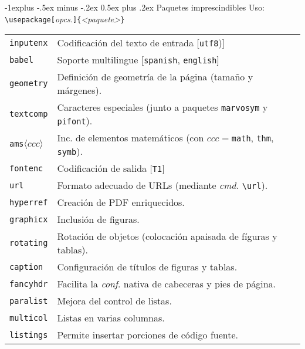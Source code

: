 \documentclass[10pt,landscape,a4paper]{article}
\makeatletter
\renewcommand{\subsection}{\@startsection{subsection}{2}{0mm}%
                                {-1explus -.5ex minus -.2ex}%
                                {0.5ex plus .2ex}%
                                {\normalfont\normalsize\bfseries}}
\makeatother
\begin{document}
\begin{multicols}{3}
\subsection{Paquetes imprescindibles}
  Uso: \verb!\usepackage[!\emph{opcs.}\verb!]{!\emph{<paquete>}\verb!}!\\[0.7mm]


\begin{tabular}{@{}p{\the\MyLen}%
                @{}p{\linewidth-\the\MyLen}@{}}
\texttt{inputenx}	& Codificación del texto de entrada [\texttt{utf8})]\\
\texttt{babel}		& Soporte multilingue [\texttt{spanish}, \texttt{english}]\\
\texttt{geometry}	& Definición de geometría de la página (tamaño y márgenes).\\
\texttt{textcomp}	& Caracteres especiales (junto a paquetes \texttt{marvosym} y \texttt{pifont}). \\
\texttt{ams}$\langle ccc \rangle$ & Inc. de elementos matemáticos (con $ccc=$\texttt{math}, \texttt{thm}, \texttt{symb}).\\
\texttt{fontenc}	& Codificación de salida [\texttt{T1}]\\
\texttt{url}		& Formato adecuado de URLs (mediante \emph{cmd.} \verb!\url!). \\
\texttt{hyperref}	& Creación de PDF enriquecidos.\\
\texttt{graphicx}	& Inclusión de figuras.\\
\texttt{rotating}	& Rotación de objetos (colocación apaisada de fíguras y tablas).\\
\texttt{caption}	& Configuración de títulos de figuras y tablas. \\
\texttt{fancyhdr}	& Facilita la \emph{conf}. nativa de cabeceras y pies de página.\\
\texttt{paralist}	& Mejora del control de listas.\\
\texttt{multicol}	& Listas en varias columnas.\\
\texttt{listings}	& Permite insertar porciones de código fuente.\\
\end{tabular}




\end{multicols}
\end{document}
